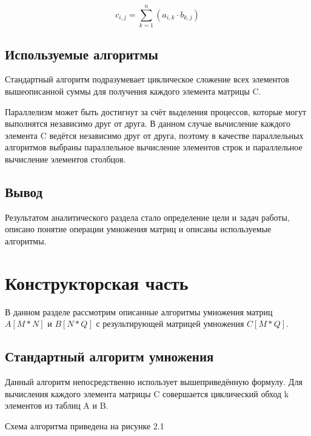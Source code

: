 \documentclass[12pt,a4paper]{report}
\begin{document}
\begin{equation}
    c_{i,j} = \sum\limits_{k=1}^n (a_{i,k} \cdot b_{k,j})
    \label{formula:1}
\end{equation}

\section{Используемые алгоритмы}

Стандартный алгоритм подразумевает циклическое сложение всех элементов вышеописанной суммы для получения
каждого элемента матрицы C.

Параллелизм может быть достигнут за счёт выделения процессов, которые могут выполнятся независимо друг от 
друга.
В данном случае вычисление каждого элемента C ведётся независимо друг от друга, поэтому в качестве 
параллельных алгоритмов выбраны параллельное вычисление элементов строк и параллельное вычисление 
элементов столбцов.

\section{Вывод}

Результатом аналитического раздела стало определение цели и задач работы, описано понятие операции 
умножения матриц и описаны используемые алгоритмы.

\newpage
\chapter{Конструкторская часть}

В данном разделе рассмотрим описанные алгоритмы умножения матриц $A[M * N]$ и $B[N * Q]$ с результирующей 
матрицей умножения $C[M * Q]$.

\section{Стандартный алгоритм умножения}

Данный алгоритм непосредственно использует вышеприведённую формулу. 
Для вычисления каждого элемента матрицы C совершается циклический обход k элементов из таблиц A и B.

Схема алгоритма приведена на рисунке 2.1
\end{document}
